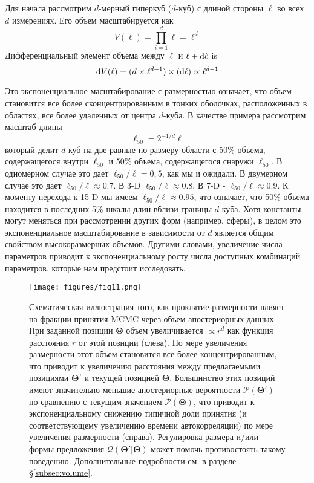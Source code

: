 \documentclass[12pt, titlepage]{article}
\newcommand{\deriv}{\ensuremath{{\rm d}}}  %
\newcommand{\params}{\ensuremath{\boldsymbol\Theta}}
\newcommand{\posterior}{\ensuremath{\mathcal{P}}}
\newcommand{\proposal}{\ensuremath{\mathcal{Q}}}
\begin{document}
Для начала рассмотрим $d$-мерный гиперкуб ($d$-куб) с длиной стороны $\ell$ во всех $d$ измерениях. Его объем масштабируется как
\begin{equation}
    V(\ell) = \prod_{i=1}^{d} \ell = \ell^d
\end{equation}
Дифференциальный элемент объема между $\ell$ и
$\ell + \deriv \ell$ is
\begin{equation}
    \deriv V(\ell) = (d \times \ell^{d-1}) \times (\deriv\ell) \propto \ell^{d-1}
\end{equation}

Это экспоненциальное масштабирование с размерностью означает, что объем становится все более сконцентрированным в тонких оболочках, расположенных в областях, все более удаленных от центра $d$-куба. 
В качестве примера рассмотрим масштаб длины
\begin{equation}
    \ell_{50} = 2^{-1/d} \ell
\end{equation}
который делит $d$-куб на две равные по размеру области с 50\% объема, содержащегося внутри $\ell_{50}$ и 50\% объема, содержащегося снаружи $\ell_{50}$. В одномерном случае это дает $\ell_{50}/\ell = 0,5$, как мы и ожидали. В двумерном случае это дает $\ell_{50}/\ell \approx 0.7$. В 3-D $\ell_{50}/\ell \approx 0.8$. В 7-D - $\ell_{50}/\ell \approx 0.9$. К моменту перехода к 15-D мы имеем $\ell_{50} /\ell\approx 0.95$, что означает, что 50\% объема находится в последних 5\% шкалы длин вблизи границы $d$-куба. Хотя константы могут меняться при рассмотрении других форм (например, сферы), в целом это экспоненциальное масштабирование в зависимости от $d$ является общим свойством высокоразмерных объемов. Другими словами, увеличение числа параметров приводит к экспоненциальному росту числа доступных комбинаций параметров, которые нам предстоит исследовать.

\begin{figure}
\begin{center}
\texttt{[image: figures/fig11.png]}
\end{center}
\caption{Схематическая иллюстрация того, как проклятие размерности влияет на фракции принятия MCMC через объем апостериорных данных. При заданной позиции $\params$ объем увеличивается $\propto r^d$ как функция расстояния $r$ от этой позиции (слева). По мере увеличения размерности этот объем становится все более концентрированным, что приводит к увеличению расстояния между предлагаемыми позициями $\params'$ и текущей позицией $\params$. Большинство этих позиций имеют значительно меньшие апостериорные вероятности $\posterior(\params')$ по сравнению с текущим значением $\posterior(\params)$, что приводит к экспоненциальному снижению типичной доли принятия (и соответствующему увеличению времени автокорреляции) по мере увеличения размерности (справа). Регулировка размера и/или формы предложения $\proposal(\params'|\params)$ может помочь противостоять такому поведению. Дополнительные подробности см. в разделе \S\ref{subsec:volume}. }\label{fig:vol}
\end{figure}
\end{document}
